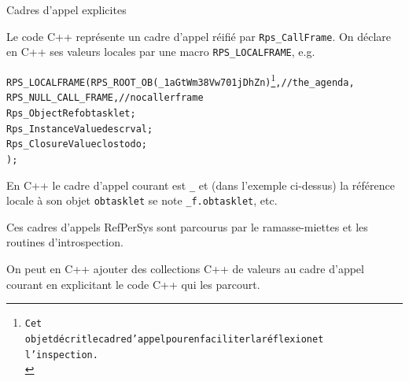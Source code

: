 \documentclass[final,a4,xcolor={svgnames,dvipsnames}]{beamer}
\begin{document}
 \begin{frame}{Cadres d'appel explicites}
   
   Le code C++ représente un cadre d'appel réifié par
   \texttt{Rps\_CallFrame}. On déclare en C++ ses valeurs locales par une macro \texttt{RPS\_LOCALFRAME}, e.g.

   \begin{relsize}{-1}
   \begin{alltt}
     RPS\_LOCALFRAME(RPS\_ROOT\_OB(\_1aGtWm38Vw701jDhZn)\footnote{Cet
     objet décrit le cadre d'appel pour en faciliter la réflexion et
     l'inspection.\medskip\\}, //the\_agenda,\\
     \hspace{8em}            RPS\_NULL\_CALL\_FRAME, // no caller frame\\
     \hspace{8em}            Rps\_ObjectRef obtasklet;\\
     \hspace{8em}            Rps\_InstanceValue descrval;\\
     \hspace{8em}            Rps\_ClosureValue clostodo;\\
                );
   \end{alltt}
   \end{relsize}
   
   En C++ le cadre d'appel courant est \texttt{\_} et (dans l'exemple ci-dessus) la référence locale à son objet \texttt{obtasklet} se note \texttt{\_f.obtasklet}, etc.
   
   Ces cadres d'appels RefPerSys sont parcourus par le ramasse-miettes et les routines d'introspection.

   On peut en C++ ajouter des collections C++ de valeurs au cadre
   d'appel courant en explicitant le code C++ qui les parcourt.
 \end{frame}
\end{document}
